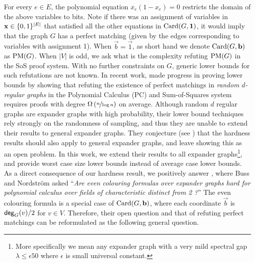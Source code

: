 \documentclass[11pt]{article}
\begin{document}
For every $e \in E$, the polynomial equation $x_e(1 - x_e) = 0$ restricts the domain of the above variables to bits.
Note if there was an assignment of variables in $\mathbf{x} \in \{0,1\}^{|E|}$ that satisfied all the other equations in $\text{Card}(G, \mathbf{1})$, it would imply that the graph $G$ has a perfect matching (given by the edges corresponding to variables with assignment 1).
When $\vec{b} = \vec{1}$, as short hand we denote $\text{Card}(G, \mathbf{b})$ as $\text{PM}(G)$.
When $|V|$ is odd, we ask what is the complexity refuting $\text{PM}(G)$ in the SoS proof system.
With no further constraints on $G$, generic lower bounds for such refutations are not known.
In recent work, \citet{Austrin_2022} made progress in proving lower bounds by showing that refuting the existence of perfect matchings in \emph{random $d$-regular graphs} in the Polynomial Calculus (PC) and Sum-of-Squares system requires proofs with degree $\Omega\left(\nicefrac{n}{\log n}\right)$ on average.
Although random $d$ regular graphs are expander graphs with high probability, their lower bound techniques rely strongly on the randomness of sampling, and thus they are unable to extend their results to general expander graphs.
They conjecture (see \citep[Section 6]{Austrin_2022}) that the hardness results should also apply to general expander graphs, and leave showing this as an open problem. In this work, we extend their results to all expander graphs\footnote{More specifically we mean any expander graph with a very mild spectral gap $\lambda \leq \epsilon 50$ where $\epsilon$ is small universal constant.}, and provide worst case size lower bounds instead of average case lower bounds.
As a direct consequence of our hardness result, we  positively answer \citep[Open Problem 7.7]{buss2021proof}, where Buss and Nordstr{\"o}m asked ``\textit{Are even colouring formulas over expander graphs hard for
polynomial calculus over fields of characteristic distinct from 2 ?}''
The even colouring formula is a special case of $\text{Card}(G, \mathbf{b})$, where each coordinate  $\vec{b}$ is $\mathsf{deg}_{G}(v)/2$ for $v \in V$.
Therefore, their open question and that of refuting perfect matchings can be reformulated as the following general question.
\end{document}
